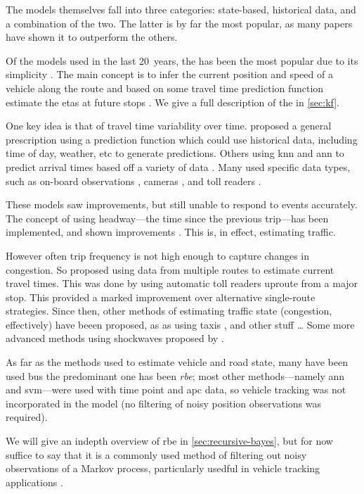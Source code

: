 The models themselves fall into three categories:
\rt{} state-based, historical data, and a combination of the two.
The latter is by far the most popular, as many papers have shown it to outperform the others.


Of the models used in the last 20~years, the \kf{} has been the most popular due to its simplicity
\citep{Wall_1999,Dailey_2001,Cathey_2003,Shalaby_2004,Yu_2010}.
The main concept is to infer the current position and speed of a vehicle along the route
and based on some travel time prediction function
estimate the \glspl{eta} at future stops
\citep{cn}.
We give a full description of the \kf{} in \cref{sec:kf}.


One key idea is that of travel time variability over time.
\cite{Cathey_2003} proposed a general prescription using a prediction function
which could use historical data, including time of day, weather, etc
to generate predictions.
Others using \gls{knn} and \gls{ann} to predict arrival times based off a variety of data
\citep{Jeong_2005,Yu_2006,Yu_2010,Yu_2011}.
Many used specific data types,
such as on-board observations \citep{cn},
cameras \citep{Xinghao_2013,Yu_2011},
and toll readers \citep{Yu_2011}.
{}

These models saw improvements, but still unable to respond to \rt{} events accurately.
The concept of using headway---the time since the previous trip---has been implemented,
and shown improvements \citep{cn}.
This is, in effect, estimating \rt{} traffic.


However often trip frequency is not high enough to capture \rt{} changes in congestion.
So \cite{Yu_2011} proposed using data from multiple routes to estimate current travel times.
This was done by using automatic toll readers uproute from a major stop.
This provided a marked improvement over alternative single-route strategies.
Since then, other methods of estimating traffic state (congestion, effectively)
have beeen proposed, as as using taxis \citep{Xinghao_2013},
and other stuff \ldots
Some more advanced methods using shockwaves proposed by \cite{Julio_2016}.


As far as the methods used to estimate \rt{} vehicle and road state,
many have been used bus the predominant one has been \emph{\gls{rbe}};
most other methods---namely \gls{ann} and \gls{svm}---were used
with time point and \gls{apc} data,
so vehicle tracking was not incorporated in the model
(no filtering of noisy position observations was required).


We will give an indepth overview of \gls{rbe} in \cref{sec:recursive-bayes},
but for now suffice to say that it is a commonly used method of filtering out
noisy observations of a Markov process, particularly usedful in vehicle tracking applications
\citep{Gordon_1993,Carpenter_1999,Gustafsson_2002}.


